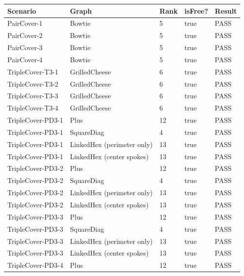 \documentclass{article}
\begin{document}
\begin{table}[ht]
\centering
\label{tab:controlled-results}
\begin{tabular}{lllll}
\toprule
Scenario & Graph & Rank & isFree? & Result \\
\midrule
PairCover-1      & Bowtie                        & 5  & true  & PASS \\
PairCover-2      & Bowtie                        & 5  & true  & PASS \\
PairCover-3      & Bowtie                        & 5  & true  & PASS \\
PairCover-4      & Bowtie                        & 5  & true  & PASS \\
\midrule
TripleCover-T3-1 & GrilledCheese                 & 6  & true  & PASS \\
TripleCover-T3-2 & GrilledCheese                 & 6  & true  & PASS \\
TripleCover-T3-3 & GrilledCheese                 & 6  & true  & PASS \\
TripleCover-T3-4 & GrilledCheese                 & 6  & true  & PASS \\
\midrule
TripleCover-PD3-1 & Plus                         & 12 & true  & PASS \\
TripleCover-PD3-1 & SquareDiag                   & 4  & true  & PASS \\
TripleCover-PD3-1 & LinkedHex (perimeter only)   & 13 & true  & PASS \\
TripleCover-PD3-1 & LinkedHex (center spokes)    & 13 & true  & PASS \\
TripleCover-PD3-2 & Plus                         & 12 & true  & PASS \\
TripleCover-PD3-2 & SquareDiag                   & 4  & true  & PASS \\
TripleCover-PD3-2 & LinkedHex (perimeter only)   & 13 & true  & PASS \\
TripleCover-PD3-2 & LinkedHex (center spokes)    & 13 & true  & PASS \\
TripleCover-PD3-3 & Plus                         & 12 & true  & PASS \\
TripleCover-PD3-3 & SquareDiag                   & 4  & true  & PASS \\
TripleCover-PD3-3 & LinkedHex (perimeter only)   & 13 & true  & PASS \\
TripleCover-PD3-3 & LinkedHex (center spokes)    & 13 & true  & PASS \\
TripleCover-PD3-4 & Plus                         & 12 & true  & PASS \\

\end{tabular}
\end{table}
\end{document}

